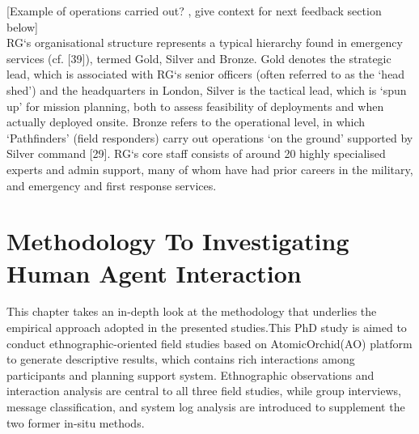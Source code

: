 [Example of operations carried out? , give context for next feedback section below]\\

RG`s organisational structure represents a typical hierarchy found in emergency services (cf. [39]), termed Gold, Silver and Bronze. Gold denotes the strategic lead, which is associated with RG`s senior officers (often referred to as the `head shed') and the headquarters in London, Silver is the tactical lead, which is `spun up' for mission planning, both to assess feasibility of deployments and when actually deployed onsite. Bronze refers to the operational level, in which `Pathfinders' (field responders) carry out operations `on the ground' supported by Silver command [29]. RG`s core staff consists of around 20 highly specialised experts and admin support, many of whom have had prior careers in the military, and emergency and first response services.\\






\chapter{ Methodology To Investigating Human Agent Interaction}
This chapter takes an in-depth look at the methodology that underlies the empirical approach adopted in the presented studies.This PhD study is aimed to conduct ethnographic-oriented field studies based on AtomicOrchid(AO) platform to generate descriptive results, which contains rich interactions among participants and planning support system. Ethnographic observations and interaction analysis are central to all three field studies, while group interviews, message classification, and system log analysis are introduced to supplement the two former in-situ methods.\\

